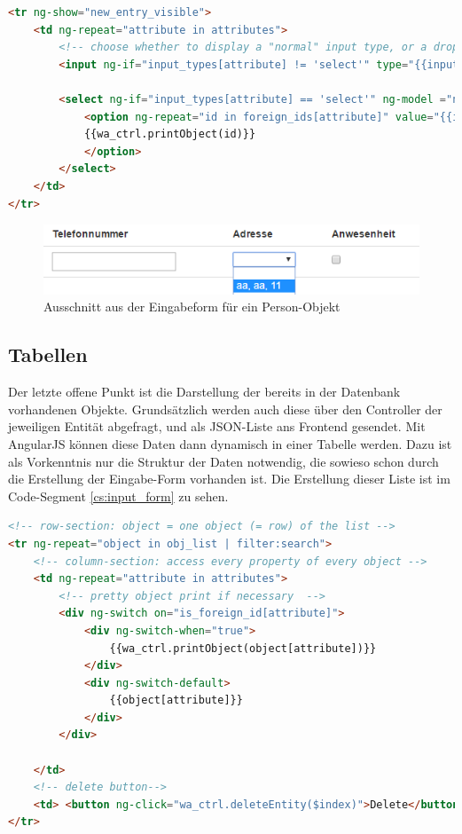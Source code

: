\scriptsize
\begin{lstlisting}[caption=Erstellung der Eingabeform in index.html, label=cs:input_form, language=HTML]
<tr ng-show="new_entry_visible">
	<td ng-repeat="attribute in attributes">
		<!-- choose whether to display a "normal" input type, or a dropdown-list-->
		<input ng-if="input_types[attribute] != 'select'" type="{{input_types[attribute]}}" name="{{attribute}}" ng-model="new_db_object[attribute]" />
		
		<select ng-if="input_types[attribute] == 'select'" ng-model ="new_db_object[attribute]">
			<option ng-repeat="id in foreign_ids[attribute]" value="{{id}}">
			{{wa_ctrl.printObject(id)}}
			</option>
		</select>
	</td>
</tr>
\end{lstlisting}
\normalsize 

\begin{figure}[h]
\centering
\includegraphics[width=0.7\linewidth]{4_frontend/pics/input_form}
\caption{Ausschnitt aus der Eingabeform für ein Person-Objekt}
\label{fig:input_form}
\end{figure}


\subsection{Tabellen}

Der letzte offene Punkt ist die Darstellung der bereits in der Datenbank vorhandenen Objekte. Grundsätzlich werden auch diese über den Controller der jeweiligen Entität abgefragt, und als JSON-Liste ans Frontend gesendet. Mit AngularJS können diese Daten dann dynamisch in einer Tabelle werden. Dazu ist als Vorkenntnis nur die Struktur der Daten notwendig, die sowieso schon durch die Erstellung der Eingabe-Form vorhanden ist. Die Erstellung dieser Liste ist im Code-Segment \ref{cs:input_form} zu sehen.

\scriptsize
\begin{lstlisting}[caption=index.html, label=cs:input_form, language=HTML]
<!-- row-section: object = one object (= row) of the list -->
<tr ng-repeat="object in obj_list | filter:search">
	<!-- column-section: access every property of every object -->
	<td ng-repeat="attribute in attributes">
		<!-- pretty object print if necessary  -->
		<div ng-switch on="is_foreign_id[attribute]">
			<div ng-switch-when="true">
				{{wa_ctrl.printObject(object[attribute])}}
			</div>
			<div ng-switch-default>
				{{object[attribute]}}
			</div>
		</div>
	
	</td>
	<!-- delete button-->
	<td> <button ng-click="wa_ctrl.deleteEntity($index)">Delete</button> </td>
</tr>
\end{lstlisting}
\normalsize 

